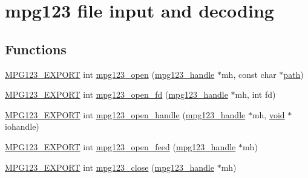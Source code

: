 \hypertarget{group__mpg123__input}{}\section{mpg123 file input and decoding}
\label{group__mpg123__input}
\subsection*{Functions}
\begin{DoxyCompactItemize}
\item 
\mbox{\hyperlink{mpg123_8h_a2ba98cfba3f760879df70e755b2a61cc}{M\+P\+G123\+\_\+\+E\+X\+P\+O\+RT}} int \mbox{\hyperlink{group__mpg123__input_ga8f74d35cf61667a791b507c76c22a29b}{mpg123\+\_\+open}} (\mbox{\hyperlink{group__mpg123__init_ga6728e2839a395f3a07d4514da659faca}{mpg123\+\_\+handle}} $\ast$mh, const char $\ast$\mbox{\hyperlink{_s_d_l__opengl__glext_8h_ab25d8cd967ccbd19b630d7100ff8f67e}{path}})
\item 
\mbox{\hyperlink{mpg123_8h_a2ba98cfba3f760879df70e755b2a61cc}{M\+P\+G123\+\_\+\+E\+X\+P\+O\+RT}} int \mbox{\hyperlink{group__mpg123__input_ga969c0cbe49b3831e18ad9e9e45c9d83e}{mpg123\+\_\+open\+\_\+fd}} (\mbox{\hyperlink{group__mpg123__init_ga6728e2839a395f3a07d4514da659faca}{mpg123\+\_\+handle}} $\ast$mh, int fd)
\item 
\mbox{\hyperlink{mpg123_8h_a2ba98cfba3f760879df70e755b2a61cc}{M\+P\+G123\+\_\+\+E\+X\+P\+O\+RT}} int \mbox{\hyperlink{group__mpg123__input_gaadda450ea307f88589cb77ffda0754ab}{mpg123\+\_\+open\+\_\+handle}} (\mbox{\hyperlink{group__mpg123__init_ga6728e2839a395f3a07d4514da659faca}{mpg123\+\_\+handle}} $\ast$mh, \mbox{\hyperlink{_s_d_l__opengles2__gl2ext_8h_ae5d8fa23ad07c48bb609509eae494c95}{void}} $\ast$iohandle)
\item 
\mbox{\hyperlink{mpg123_8h_a2ba98cfba3f760879df70e755b2a61cc}{M\+P\+G123\+\_\+\+E\+X\+P\+O\+RT}} int \mbox{\hyperlink{group__mpg123__input_ga072669ae9bde29eea8cffa4be10c7345}{mpg123\+\_\+open\+\_\+feed}} (\mbox{\hyperlink{group__mpg123__init_ga6728e2839a395f3a07d4514da659faca}{mpg123\+\_\+handle}} $\ast$mh)
\item 
\mbox{\hyperlink{mpg123_8h_a2ba98cfba3f760879df70e755b2a61cc}{M\+P\+G123\+\_\+\+E\+X\+P\+O\+RT}} int \mbox{\hyperlink{group__mpg123__input_ga156eb0774196db868485662dc31621af}{mpg123\+\_\+close}} (\mbox{\hyperlink{group__mpg123__init_ga6728e2839a395f3a07d4514da659faca}{mpg123\+\_\+handle}} $\ast$mh)
\item 

\end{DoxyCompactItemize}
